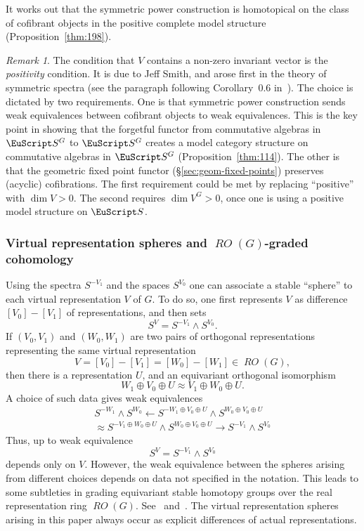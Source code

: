 \documentclass{amsart}
\newtheorem{rem}[equation]{Remark}
\theoremstyle{definition}
\theoremstyle{remark}
\newtheorem{rem}[equation]{Remark}
\newcommand{\spectra}{\EuScript S}
\newcommand{\ugspectra}[1]{\spectra^{#1}}
\DeclareMathOperator{\RO}{\mathit {RO}}
\begin{document}
It works out that the symmetric power construction is homotopical on
the class of cofibrant objects in the positive complete model
structure (Proposition~\ref{thm:198}).



\begin{rem}
\label{rem:30} The condition that $V$ contains a non-zero invariant
vector is the {\em positivity} condition.  It is due to Jeff Smith,
and arose first in the theory of symmetric spectra (see the paragraph
following Corollary~0.6 in~\cite{MR1806878}).  The choice is dictated
by two requirements.  One is that symmetric power construction sends
weak equivalences between cofibrant objects to weak equivalences.
This is the key point in showing that the forgetful functor from
commutative algebras in $\ugspectra{G}$ to $\ugspectra{G}$ creates a
model category structure on commutative algebras in $\ugspectra{G}$
(Proposition~\ref{thm:114}).  The other is that the geometric fixed
point functor (\S\ref{sec:geom-fixed-points}) preserves (acyclic)
cofibrations.  The first requirement could be met by replacing
``positive'' with $\dim V>0$.  The second requires $\dim V^{G}>0$,
once one is using a positive model structure on $\spectra$.
\end{rem}

\subsubsection{Virtual representation spheres and \texorpdfstring{$\RO(G)$}{RO(G)}-graded cohomology}
\label{sec:smash-product-stable}

Using the spectra $S^{-V_{1}}$ and the spaces $S^{V_{0}}$ one can
associate a stable ``sphere'' to each virtual representation $V$ of
$G$.  To do so, one first represents $V$ as difference
$[V_{0}]-[V_{1}]$ of representations, and then sets
\[
S^{V} = S^{-V_{1}}\wedge S^{V_{0}}.  
\]
If $(V_{0}, V_{1})$ and $(W_{0}, W_{1})$ are two pairs of
orthogonal representations representing the same virtual
representation
\[
V=[V_{0}]-[V_{1}] = [W_{0}]-[W_{1}]\in \RO(G),
\]
then there is a representation $U$, and an equivariant orthogonal
isomorphism
\[
W_{1}\oplus V_{0}\oplus U\approx
V_{1}\oplus W_{0}\oplus U. 
\]
A choice of such data gives weak equivalences 
\begin{multline*}
S^{-W_{1}}\wedge S^{W_{0}} \leftarrow
S^{-W_{1}\oplus V_{0}\oplus U}\wedge S^{W_{0}\oplus V_{0}\oplus U}  \\
\approx
S^{-V_{1}\oplus W_{0}\oplus U}\wedge S^{W_{0}\oplus V_{0}\oplus U} \rightarrow
S^{-V_{1}}\wedge S^{V_{0}}
\end{multline*}
Thus, up to weak equivalence 
\[
S^{V}=S^{-V_{1}}\wedge S^{V_{0}} 
\]
depends only on $V$.  However, the weak equivalence between the
spheres arising from different choices depends on data not specified
in the notation.  This leads to some subtleties in grading equivariant
stable homotopy groups over the real representation ring $\RO(G)$.
See~\cite[\S6]{MR764596} and~\cite[Chapter XIII]{MR1413302}.  The
virtual representation spheres arising in this paper always occur as
explicit differences of actual representations.
\end{document}
